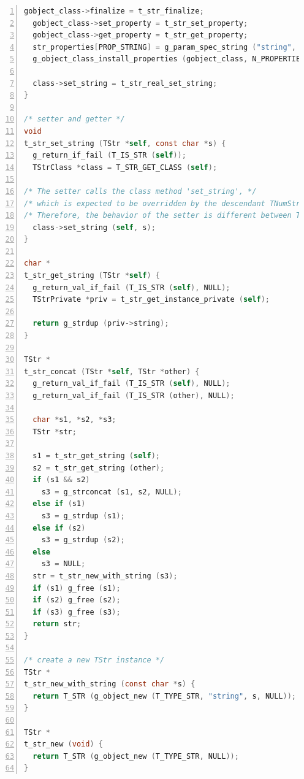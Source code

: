 \begin{lstlisting}[language=C, numbers=left]
  gobject_class->finalize = t_str_finalize;
  gobject_class->set_property = t_str_set_property;
  gobject_class->get_property = t_str_get_property;
  str_properties[PROP_STRING] = g_param_spec_string ("string", "str", "string", "", G_PARAM_READWRITE);
  g_object_class_install_properties (gobject_class, N_PROPERTIES, str_properties);

  class->set_string = t_str_real_set_string;
}

/* setter and getter */
void
t_str_set_string (TStr *self, const char *s) {
  g_return_if_fail (T_IS_STR (self));
  TStrClass *class = T_STR_GET_CLASS (self);

/* The setter calls the class method 'set_string', */
/* which is expected to be overridden by the descendant TNumStr. */
/* Therefore, the behavior of the setter is different between TStr and TNumStr. */
  class->set_string (self, s);
}

char *
t_str_get_string (TStr *self) {
  g_return_val_if_fail (T_IS_STR (self), NULL);
  TStrPrivate *priv = t_str_get_instance_private (self);

  return g_strdup (priv->string);
}

TStr *
t_str_concat (TStr *self, TStr *other) {
  g_return_val_if_fail (T_IS_STR (self), NULL);
  g_return_val_if_fail (T_IS_STR (other), NULL);

  char *s1, *s2, *s3;
  TStr *str;

  s1 = t_str_get_string (self);
  s2 = t_str_get_string (other);
  if (s1 && s2)
    s3 = g_strconcat (s1, s2, NULL);
  else if (s1)
    s3 = g_strdup (s1);
  else if (s2)
    s3 = g_strdup (s2);
  else
    s3 = NULL;
  str = t_str_new_with_string (s3);
  if (s1) g_free (s1);
  if (s2) g_free (s2);
  if (s3) g_free (s3);
  return str;
}

/* create a new TStr instance */
TStr *
t_str_new_with_string (const char *s) {
  return T_STR (g_object_new (T_TYPE_STR, "string", s, NULL));
}

TStr *
t_str_new (void) {
  return T_STR (g_object_new (T_TYPE_STR, NULL));
}
\end{lstlisting}

